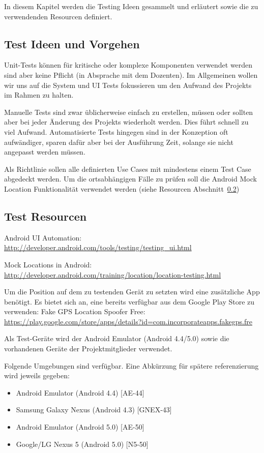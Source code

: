 In diesem Kapitel werden die Testing Ideen gesammelt und erläutert sowie die zu verwendenden Resourcen definiert.

\subsection{Test Ideen und Vorgehen}
Unit-Tests können für kritische oder komplexe Komponenten verwendet werden sind aber keine Pflicht (in Absprache mit dem Dozenten). 
Im Allgemeinen wollen wir uns auf die System und UI Tests fokussieren um den Aufwand des Projekts im Rahmen zu halten.

\medskip
Manuelle Tests sind zwar üblicherweise einfach zu erstellen, müssen oder sollten aber bei jeder Änderung des Projekts wiederholt werden. Dies führt schnell zu viel Aufwand. 
Automatisierte Tests hingegen sind in der Konzeption oft aufwändiger, sparen dafür aber bei der Ausführung Zeit, solange sie nicht angepasst werden müssen.

\medskip
Als Richtlinie sollen alle definierten Use Cases mit mindestens einem Test Case abgedeckt werden. 
Um die ortsabhängigen Fälle zu prüfen soll die Android Mock Location Funktionalität verwendet werden (siehe Resourcen Abschnitt~\ref{sec:test_resources})

\subsection{Test Resourcen}
\label{sec:test_resources}
Android UI Automation: \url{http://developer.android.com/tools/testing/testing_ui.html}

Mock Locations in Android: \url{http://developer.android.com/training/location/location-testing.html}

Um die Position auf dem zu testenden Gerät zu setzten wird eine zusätzliche App benötigt. Es bietet sich an, eine bereits verfügbar aus dem Google Play Store zu verwenden:
Fake GPS Location Spoofer Free: \url{https://play.google.com/store/apps/details?id=com.incorporateapps.fakegps.fre}

\medskip

Als Test-Geräte wird der Android Emulator (Android 4.4/5.0) sowie die vorhandenen Geräte der Projektmitglieder verwendet. 

\medskip
Folgende Umgebungen sind verfügbar. Eine Abkürzung für spätere referenzierung wird jeweils gegeben:

\begin{itemize}
\item Android Emulator (Android 4.4) [AE-44]
\item Samsung Galaxy Nexus (Android 4.3) [GNEX-43]
\item Android Emulator (Android 5.0) [AE-50]
\item Google/LG Nexus 5 (Android 5.0) [N5-50]
\end{itemize}

